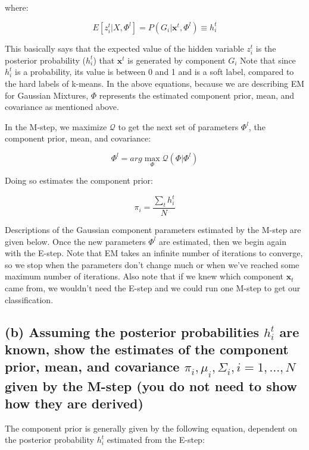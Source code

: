 \documentclass{article}
\begin{document}
where:

\begin{equation}
E [ z_i^t | X, \Phi^l ] = P ( G_i | \mathbf{x}^t, \Phi^l) \equiv h_i^t
\end{equation}

This basically says that the expected value of the hidden variable $z_i^t$ is the posterior probability ($h_i^t$) that $\mathbf{x}^t$ is generated by component $G_i$  Note that since $h_i^t$ is a probability, its value is between 0 and 1 and is a soft label, compared to the hard labels of k-means.  In the above equations, because we are describing EM for Gaussian Mixtures, $\Phi$ represents the estimated component prior, mean, and covariance as mentioned above.

In the M-step, we maximize $\mathcal{Q}$ to get the next set of parameters $\Phi^l$, the component prior, mean, and covariance:

\begin{equation}
\Phi^l = arg \max\limits_\Phi \mathcal{Q} ( \Phi | \Phi^l)
\end{equation}

Doing so estimates the component prior:

\begin{equation}
\pi_i = \frac{ \sum_t h_i^t }{ N }
\end{equation}

Descriptions of the Gaussian component parameters estimated by the M-step are given below.  Once the new parameters $\Phi^l$ are estimated, then we begin again with the E-step.  Note that EM takes an infinite number of iterations to converge, so we stop when the parameters don't change much or when we've reached some maximum number of iterations.  Also note that if we knew which component $\mathbf{x}_t$ came from, we wouldn't need the E-step and we could run one M-step to get our classification.

\subsection{(b) Assuming the posterior probabilities $h_i^t$ are known, show the estimates of the component prior, mean, and covariance $\pi_i, \mu_i, \Sigma_i, i = 1, \dots, N$ given by the M-step (you do not need to show how they are derived)}

The component prior is generally given by the following equation, dependent on the posterior probability $h_i^t$ estimated from the E-step:
\end{document}

